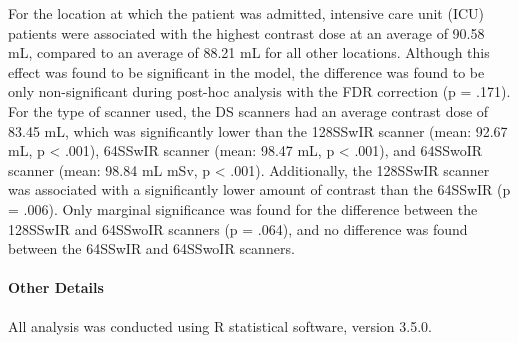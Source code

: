 \documentclass[]{article}
\let\oldparagraph\paragraph
\renewcommand{\paragraph}[1]{\oldparagraph{#1}\mbox{}}
\begin{document}
For the location at which the patient was admitted, intensive care unit
(ICU) patients were associated with the highest contrast dose at an
average of 90.58 mL, compared to an average of 88.21 mL for all other
locations. Although this effect was found to be significant in the
model, the difference was found to be only non-significant during
post-hoc analysis with the FDR correction (p = .171). For the type of
scanner used, the DS scanners had an average contrast dose of 83.45 mL,
which was significantly lower than the 128SSwIR scanner (mean: 92.67 mL,
p \textless{} .001), 64SSwIR scanner (mean: 98.47 mL, p \textless{}
.001), and 64SSwoIR scanner (mean: 98.84 mL mSv, p \textless{} .001).
Additionally, the 128SSwIR scanner was associated with a significantly
lower amount of contrast than the 64SSwIR (p = .006). Only marginal
significance was found for the difference between the 128SSwIR and
64SSwoIR scanners (p = .064), and no difference was found between the
64SSwIR and 64SSwoIR scanners.

\paragraph{Other Details}\label{other-details}

All analysis was conducted using R statistical software, version 3.5.0.
\end{document}
